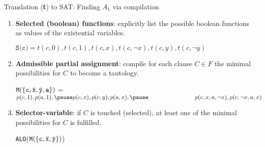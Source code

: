 \documentclass[xcolor=table	]{beamer}
\newcommand{\ov}[1]{\mkern 1.5mu\overline{\mkern-1.5mu#1\mkern-1.5mu}\mkern 1.5mu}
\begin{document}
%

\begin{frame}{Translation (\textbf{t}) to SAT: Finding $A_1$ via compilation}
\begin{enumerate}
    \item \textbf{Selected (boolean) functions}: 
    explicitly list the possible boolean functions as values of the existential variables. \newline
 
    $\texttt{S(c)} = t(c, 0) , t(c, 1), t(c, x), t(c, \neg x), t(c, y), t(c, \neg y)$	 \newline 

   \pause   
  
    \item\textbf{Admissible partial assignment}:
    compile for each clause $C \in F$ the minimal possibilities
    for $C$ to become a tautology. \newline 
    
    $\texttt{M} (\{\texttt{c},\ov{\texttt{x}},\ov{\texttt{y}}, \texttt{a}\})$ = 
    $p(c, 1) , p(a, 1),
    \pause 
    p(c, x), p(c, y), p(a, x), \newline 
    \pause 
   \hspace{2.75cm} p(c, x, a, \neg x), p(c, \neg x, a, x) $ \newline 
    \pause
    \item \textbf{Selector-variable}: if $C$ is touched (selected), at least one of the minimal possibilities for $C$ is fulfilled. \newline 
    
    \texttt{ALO}($\texttt{M} (\{\texttt{c},\ov{\texttt{x}},\ov{\texttt{y}} \})$)
\end{enumerate}

\end{frame}
\end{document}
